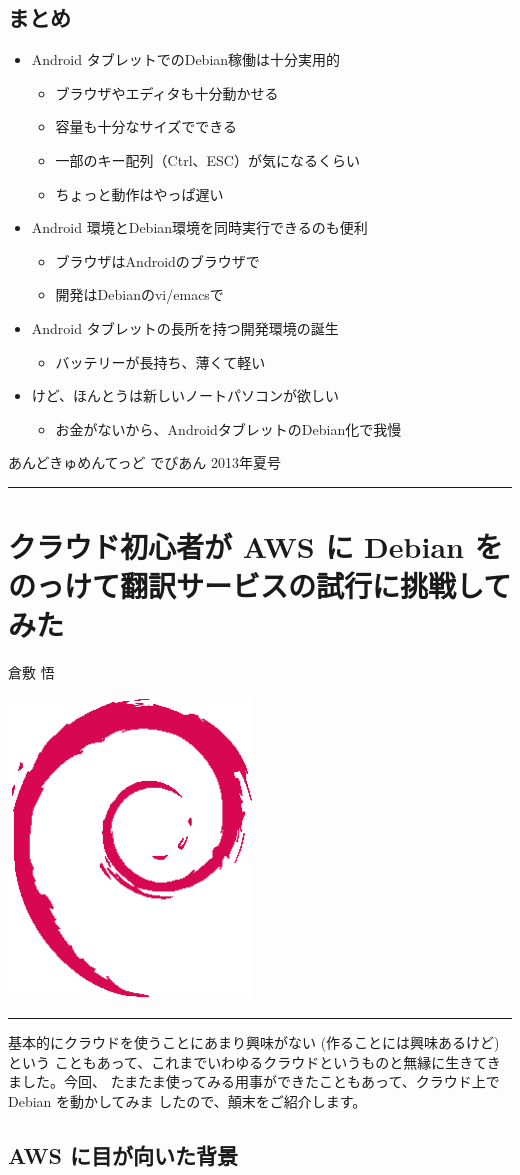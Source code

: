 \documentclass[mingoth,a4paper]{jsarticle}
\renewcommand{\dancersection}[2]{%
\newpage
あんどきゅめんてっど でびあん 2013年夏号
%
\vspace{0.1mm}\\
{\color{dancerdarkblue}\rule{\hsize}{2mm}}

%
%
\begin{minipage}[t]{0.6\hsize}
\color{dancerdarkblue}
\vspace{1cm}
\section{#1}
\hfill{}#2\\
\end{minipage}
\begin{minipage}[t]{0.4\hsize}
\vspace{-2cm}
\hfill{}\includegraphics[height=8cm]{image200502/openlogo-nd.eps}\\
\vspace{-5cm}
\end{minipage}
%
{\color{dancerlightblue}\rule{0.66\hsize}{2mm}}
%
\vspace{2cm}
}
\begin{document}
\subsection{まとめ}
\begin{itemize}
 \item Android タブレットでのDebian稼働は十分実用的
       \begin{itemize}
        \item ブラウザやエディタも十分動かせる
        \item 容量も十分なサイズでできる
        \item 一部のキー配列（Ctrl、ESC）が気になるくらい
        \item ちょっと動作はやっぱ遅い
       \end{itemize}
 \item Android 環境とDebian環境を同時実行できるのも便利
       \begin{itemize}
        \item ブラウザはAndroidのブラウザで
        \item 開発はDebianのvi/emacsで
       \end{itemize}
 \item Android タブレットの長所を持つ開発環境の誕生
       \begin{itemize}
        \item バッテリーが長持ち、薄くて軽い
       \end{itemize}
 \item けど、ほんとうは新しいノートパソコンが欲しい
       \begin{itemize}
        \item お金がないから、AndroidタブレットのDebian化で我慢
       \end{itemize}
\end{itemize}

\clearpage

\dancersection{クラウド初心者が AWS に Debian をのっけて翻訳サービスの試行に挑戦してみた}{倉敷 悟}

基本的にクラウドを使うことにあまり興味がない (作ることには興味あるけど) という
こともあって、これまでいわゆるクラウドというものと無縁に生きてきました。今回、
たまたま使ってみる用事ができたこともあって、クラウド上で Debian を動かしてみま
したので、顛末をご紹介します。

\subsection{AWS に目が向いた背景}
\end{document}
